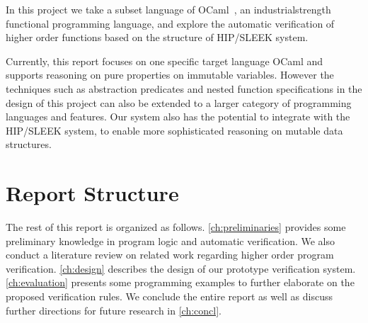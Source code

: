 In this project we take a subset language of OCaml~\cite{OCaml}, an industrial\zz{}strength functional programming language, and explore the automatic verification of higher order functions based on the structure of HIP/SLEEK system.

Currently, this report focuses on one specific target language OCaml and supports reasoning
on pure properties on immutable variables. However the techniques such as abstraction
predicates and nested function specifications in the design of this project can also be extended
to a larger category of programming languages and features. Our system also has the potential
to integrate with the HIP/SLEEK system, to enable more sophisticated reasoning on mutable
data structures.


\section{Report Structure}

The rest of this report is organized as follows. 
\autoref{ch:preliminaries} provides some preliminary knowledge in program logic and automatic verification. We also conduct a literature review on related work regarding higher order program verification. 
\autoref{ch:design} describes the design of our prototype verification system.
\autoref{ch:evaluation} presents some programming examples to further elaborate on the proposed verification rules.
We conclude the entire report as well as discuss further directions for future research in \autoref{ch:concl}.
